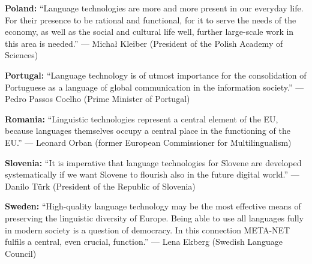 \documentclass[10pt, plain]{../../metanetpaper}
\begin{document}


\medskip \textbf{Poland:} ``Language technologies are more and more present in our everyday life. For their presence to be rational and functional, for it to serve the needs of the economy, as well as the social and cultural life well, further large-scale work in this area is needed.'' --- Michał Kleiber (President of the Polish Academy of Sciences)

\medskip \textbf{Portugal:} ``Language technology is of utmost importance for the consolidation of Portuguese as a language of global communication in the information society.'' --- Pedro Passos Coelho (Prime Minister of Portugal)

\medskip \textbf{Romania:} ``Linguistic technologies represent a central element of the EU, because languages themselves occupy a central place in the functioning of the EU.'' --- Leonard Orban (former European Commissioner for Multilingualism)

\medskip \textbf{Slovenia:} ``It is imperative that language technologies for Slovene are developed systematically if we want Slovene to flourish also in the future digital world.'' --- Danilo Türk (President of the Republic of Slovenia)


\medskip \textbf{Sweden:} ``High-quality language technology may be the most effective means of preserving the linguistic diversity of Europe. Being able to use all languages fully in modern society is a question of democracy. In this connection META-NET fulfils a central, even crucial, function.'' --- Lena Ekberg (Swedish Language Council)

\end{document}
